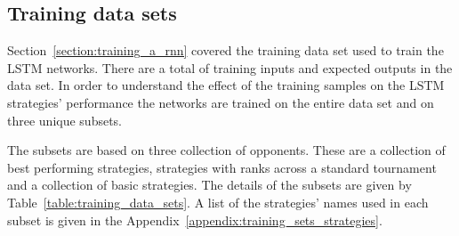 \subsection{Training data sets}

Section~\ref{section:training_a_rnn} covered the training data set used to train
the LSTM networks. There are a total of \trainingpoint training inputs and expected
outputs in the data set. In order to understand the effect of the training
samples on the LSTM strategies' performance the networks are trained on the
entire data set and on three unique subsets.

The subsets are based on three collection of opponents. These are a collection
of best performing strategies, strategies with ranks across a standard
tournament and a collection of basic strategies. The details of the subsets are
given by Table~\ref{table:training_data_sets}.
A list of the strategies' names used in each subset is given in the Appendix~\ref{appendix:training_sets_strategies}.

\begin{table}[htb]
    \centering
    \caption{Training data sets used to train the LSTM networks. The IPD
    standard tournament with the 218 opponent has been carried out using APL version
    3.10.0. The results are available at~\cite{std_tournament_results}.}\label{table:training_data_sets}
\end{table}

